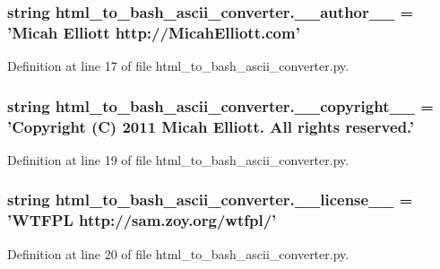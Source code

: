 \subsubsection[{\-\_\-\-\_\-author\-\_\-\-\_\-}]{\setlength{\rightskip}{0pt plus 5cm}string html\-\_\-to\-\_\-bash\-\_\-ascii\-\_\-converter.\-\_\-\-\_\-author\-\_\-\-\_\- = 'Micah Elliott http\-://Micah\-Elliott.\-com'}\label{namespacehtml__to__bash__ascii__converter_ada82e810207023e3a203646f9a522180}


Definition at line 17 of file html\-\_\-to\-\_\-bash\-\_\-ascii\-\_\-converter.\-py.

\subsubsection[{\-\_\-\-\_\-copyright\-\_\-\-\_\-}]{\setlength{\rightskip}{0pt plus 5cm}string html\-\_\-to\-\_\-bash\-\_\-ascii\-\_\-converter.\-\_\-\-\_\-copyright\-\_\-\-\_\- = 'Copyright (C) 2011 Micah Elliott. All rights reserved.'}\label{namespacehtml__to__bash__ascii__converter_a0d3762ea7dad16c05073a567ff6d0d0e}


Definition at line 19 of file html\-\_\-to\-\_\-bash\-\_\-ascii\-\_\-converter.\-py.

\subsubsection[{\-\_\-\-\_\-license\-\_\-\-\_\-}]{\setlength{\rightskip}{0pt plus 5cm}string html\-\_\-to\-\_\-bash\-\_\-ascii\-\_\-converter.\-\_\-\-\_\-license\-\_\-\-\_\- = 'W\-T\-F\-P\-L http\-://sam.\-zoy.\-org/wtfpl/'}\label{namespacehtml__to__bash__ascii__converter_add6f787e8185652126e45cf581b34d32}


Definition at line 20 of file html\-\_\-to\-\_\-bash\-\_\-ascii\-\_\-converter.\-py.


